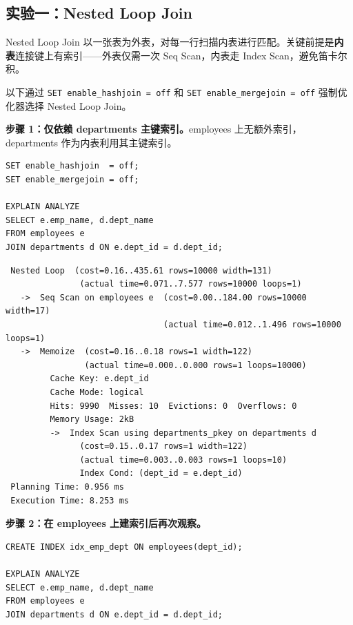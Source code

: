 \documentclass[12pt, a4paper]{academics}
\begin{document}
\subsection{实验一：Nested Loop Join}

Nested Loop Join 以一张表为外表，对每一行扫描内表进行匹配。关键前提是\textbf{内表}连接键上有索引——外表仅需一次 Seq Scan，内表走 Index Scan，避免笛卡尔积。

以下通过 \texttt{SET enable\_hashjoin = off} 和 \texttt{SET enable\_mergejoin = off} 强制优化器选择 Nested Loop Join。

\textbf{步骤 1：仅依赖 departments 主键索引。}employees 上无额外索引，departments 作为内表利用其主键索引。

\begin{verbatim}
SET enable_hashjoin  = off;
SET enable_mergejoin = off;

EXPLAIN ANALYZE
SELECT e.emp_name, d.dept_name
FROM employees e
JOIN departments d ON e.dept_id = d.dept_id;
\end{verbatim}

\begin{verbatim}
 Nested Loop  (cost=0.16..435.61 rows=10000 width=131)
               (actual time=0.071..7.577 rows=10000 loops=1)
   ->  Seq Scan on employees e  (cost=0.00..184.00 rows=10000 width=17)
                                (actual time=0.012..1.496 rows=10000 loops=1)
   ->  Memoize  (cost=0.16..0.18 rows=1 width=122)
                (actual time=0.000..0.000 rows=1 loops=10000)
         Cache Key: e.dept_id
         Cache Mode: logical
         Hits: 9990  Misses: 10  Evictions: 0  Overflows: 0
         Memory Usage: 2kB
         ->  Index Scan using departments_pkey on departments d
               (cost=0.15..0.17 rows=1 width=122)
               (actual time=0.003..0.003 rows=1 loops=10)
               Index Cond: (dept_id = e.dept_id)
 Planning Time: 0.956 ms
 Execution Time: 8.253 ms
\end{verbatim}

\textbf{步骤 2：在 employees 上建索引后再次观察。}

\begin{verbatim}
CREATE INDEX idx_emp_dept ON employees(dept_id);

EXPLAIN ANALYZE
SELECT e.emp_name, d.dept_name
FROM employees e
JOIN departments d ON e.dept_id = d.dept_id;
\end{verbatim}
\end{document}
